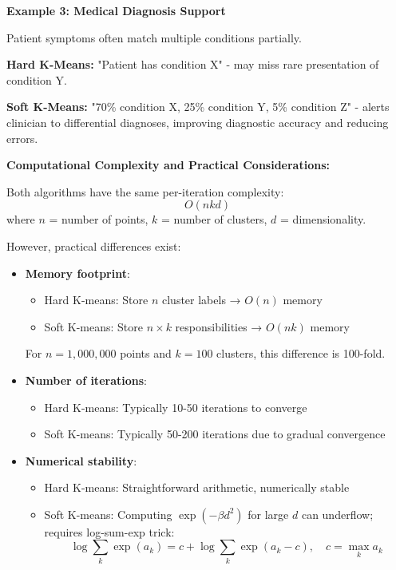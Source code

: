 \documentclass[12pt]{article}
\begin{document}
\begin{explanation}
\textbf{Example 3: Medical Diagnosis Support}

Patient symptoms often match multiple conditions partially.

\textbf{Hard K-Means:} "Patient has condition X" - may miss rare presentation of condition Y.

\textbf{Soft K-Means:} "70\% condition X, 25\% condition Y, 5\% condition Z" - alerts clinician to differential diagnoses, improving diagnostic accuracy and reducing errors.

\textbf{Computational Complexity and Practical Considerations:}

Both algorithms have the same per-iteration complexity:
\[
O(nkd)
\]
where $n$ = number of points, $k$ = number of clusters, $d$ = dimensionality.

However, practical differences exist:

\begin{itemize}
    \item \textbf{Memory footprint}:
    \begin{itemize}
        \item Hard K-means: Store $n$ cluster labels → $O(n)$ memory
        \item Soft K-means: Store $n \times k$ responsibilities → $O(nk)$ memory
    \end{itemize}
    For $n = 1,000,000$ points and $k = 100$ clusters, this difference is 100-fold.

    \item \textbf{Number of iterations}:
    \begin{itemize}
        \item Hard K-means: Typically 10-50 iterations to converge
        \item Soft K-means: Typically 50-200 iterations due to gradual convergence
    \end{itemize}

    \item \textbf{Numerical stability}:
    \begin{itemize}
        \item Hard K-means: Straightforward arithmetic, numerically stable
        \item Soft K-means: Computing $\exp(-\beta d^2)$ for large $d$ can underflow; requires log-sum-exp trick:
        \[
        \log \sum_k \exp(a_k) = c + \log \sum_k \exp(a_k - c), \quad c = \max_k a_k
        \]
    \end{itemize}


\end{itemize}
\end{explanation}
\end{document}
